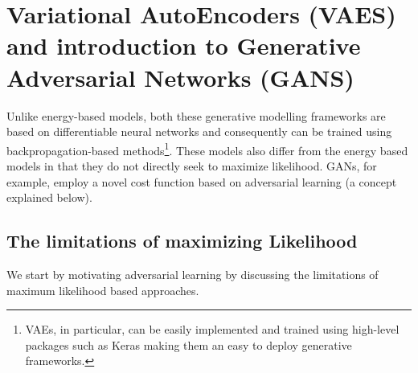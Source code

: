 \section{Variational AutoEncoders (VAES) and introduction to Generative Adversarial Networks (GANS)}
\label{sec:vaeGan}
Unlike energy-based models, both these generative modelling frameworks are based on differentiable neural networks and consequently can be trained using backpropagation-based methods\footnote{ VAEs, in particular, can be easily implemented and trained using high-level packages such as Keras making them an easy to deploy generative frameworks.}. These models also differ from the energy based models in that they do not directly seek to maximize likelihood. GANs, for example, employ a novel cost function based on adversarial learning (a concept explained below). 

\subsection{The limitations of maximizing Likelihood}
\label{subsec:vaeGanMotivation}
We start by motivating adversarial learning by discussing the limitations of maximum likelihood based approaches.
